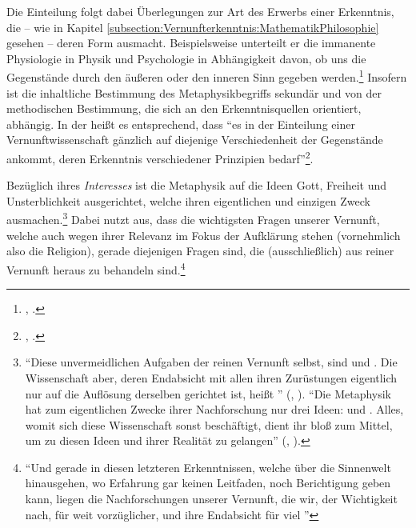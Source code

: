 \begin{nummerierung}
Die Einteilung folgt dabei Überlegungen zur Art des Erwerbs einer Erkenntnis,
die -- wie in Kapitel \ref{subsection:Vernunfterkenntnis:MathematikPhilosophie}
gesehen -- deren Form ausmacht. Beispielsweise unterteilt er die immanente
Physiologie in Physik und Psychologie in Abhängigkeit davon, ob uns die
Gegenstände durch den äußeren oder den inneren Sinn gegeben
werden.\footnote{\cite[Vgl.][B 874]{Kant:KritikderreinenVernunft2003},
\cite[][III: 546.36--547.10]{Kant:GesammelteWerke1900ff.}.} Insofern ist
die inhaltliche Bestimmung des Metaphysikbegriffs sekundär und von der
methodischen Bestimmung, die sich an den Erkenntnisquellen orientiert, abhängig.
In der  heißt es entsprechend, dass \enquote{es
in der Einteilung einer Vernunftwissenschaft gänzlich auf diejenige
Verschiedenheit der Gegenstände ankommt, deren Erkenntnis verschiedener
Prinzipien bedarf}\footnote{\cite[][B xiii]{Kant:KritikderUrteilskraft2009},
\cite[][V: 172.17--19]{Kant:GesammelteWerke1900ff.}.}.
%
%
\item\label{InteresseDerMetaphysik} Bezüglich ihres \emph{Interesses} ist die
Metaphysik auf die Ideen Gott, Freiheit und Unsterblichkeit ausgerichtet, welche ihren eigentlichen und
einzigen Zweck ausmachen.\footnote{\enquote{Diese unvermeidlichen Aufgaben der
reinen Vernunft selbst, sind  und . Die
Wissenschaft aber, deren Endabsicht mit allen ihren Zurüstungen eigentlich nur
auf die Auflösung derselben gerichtet ist, heißt }
\mkbibparens{\cite[][B~7]{Kant:KritikderreinenVernunft2003}, \cite[][III:
31.6--9]{Kant:GesammelteWerke1900ff.}}. \enquote{Die Metaphysik hat zum
eigentlichen Zwecke ihrer Nachforschung nur drei Ideen:  und
 \punkt. Alles, womit sich diese Wissenschaft sonst
beschäftigt, dient ihr bloß zum Mittel, um zu diesen Ideen und ihrer Realität zu
gelangen} \mkbibparens{\cite[][B~395]{Kant:KritikderreinenVernunft2003},
\cite[][III: 260.20--24]{Kant:GesammelteWerke1900ff.}}.} Dabei nutzt
 aus, dass die wichtigsten Fragen unserer Vernunft, welche auch wegen ihrer
Relevanz im Fokus der Aufklärung stehen (vornehmlich also die Religion), gerade
diejenigen Fragen sind, die (ausschließlich) aus reiner Vernunft heraus zu
behandeln sind.\footnote{\enquote{Und gerade in diesen letzteren Erkenntnissen,
welche über die Sinnenwelt hinausgehen, wo Erfahrung gar keinen Leitfaden, noch
Berichtigung geben kann, liegen die Nachforschungen unserer Vernunft, die wir,
der Wichtigkeit nach, für weit vorzüglicher, und ihre Endabsicht für viel
}}
\end{nummerierung}

